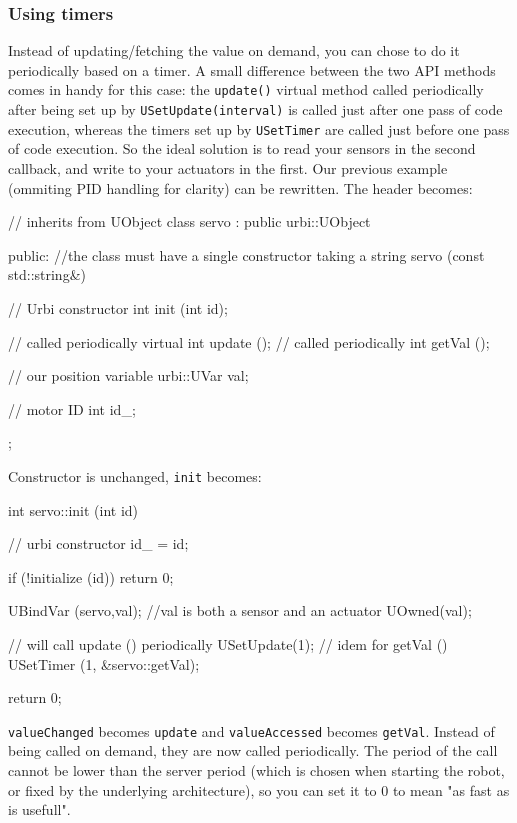 \subsubsection{Using timers}

Instead of updating/fetching the value on demand, you can chose to do
it periodically based on a timer. A small difference between the two
API methods comes in handy for this case: the \lstinline{update()} virtual method
called periodically after being set up by \lstinline{USetUpdate(interval)} is
called just after one pass of \urbi code execution, whereas the timers
set up by \lstinline{USetTimer} are called just before one pass of \urbi code
execution. So the ideal solution is to read your sensors in the second
callback, and write to your actuators in the first. Our previous
example (ommiting PID handling for clarity) can be rewritten. The
header becomes:

\begin{urbiscript}
// inherits from UObject
class servo : public urbi::UObject
{
public:
  //the class must have a single constructor taking a string
  servo (const std::string&)

  // Urbi constructor
  int init (int id);

  // called periodically
  virtual int update ();
  // called periodically
  int getVal ();

  // our position variable
  urbi::UVar val;

  // motor ID
  int id_;
};
\end{urbiscript}

Constructor is unchanged, \lstinline{init} becomes:

\begin{urbiscript}
int
servo::init (int id)
{
  // urbi constructor
  id_ = id;

  if (!initialize (id))
    return 0;

  UBindVar (servo,val);
  //val is both a sensor and an actuator
  UOwned(val);

  // will call update () periodically
  USetUpdate(1);
  // idem for getVal ()
  USetTimer (1, &servo::getVal);

  return 0;
}
\end{urbiscript}

\lstinline{valueChanged} becomes \lstinline{update} and
\lstinline{valueAccessed} becomes \lstinline{getVal}. Instead of being
called on demand, they are now called periodically. The period of the
call cannot be lower than the server period (which is chosen when
starting the robot, or fixed by the underlying architecture), so you
can set it to 0 to mean "as fast as is usefull".


